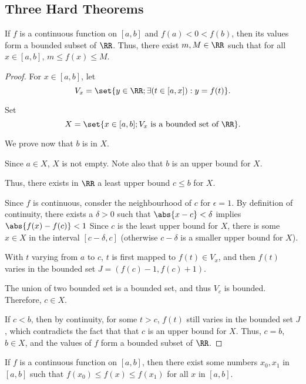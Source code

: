\documentclass[11pt]{scrartcl}
\begin{document}
\subsection{Three Hard Theorems}
\label{subsec:tht}
\begin{theorem}
  \label{thm:bounded}
  If \(f\) is a continuous function on \([a,b]\) and \(f(a)<0<f(b)\), then its
  values form a bounded subset of \(\RR\). Thus, there exist
  \(m,M\in\RR\) such that for all \(x\in[a,b]\), \(m\leq f(x)\leq M\).
\end{theorem}
\begin{proof}
  For \(x \in [a,b]\), let
  \[V_{x}=\set{y\in\RR ; \exists (t\in[a,x]):y = f(t)}.\]

  Set \[X=\set{x\in[a,b];V_{x}\text{\ is a bounded set of\ }\RR }.\]

  We prove now that \(b\) is in \(X\).\vv

  Since \(a\in X\), \(X\) is not empty. Note also that \(b\) is an
  upper bound for \(X\).

  Thus, there exists in \(\RR\) a least upper bound \(c \leq b\) for
  \(X\). \vv

  Since \(f\) is continuous, consder the neighbourhood of \(c\) for
  \(\epsilon = 1\). By definition of continuity, there exists a
  \(\delta > 0\) such that \(\abs{x-c}<\delta\) implies
  \(\abs{f(x) - f(c)}<1\) Since \(c\) is the least upper bound for
  \(X\), there is some \(x\in X\) in the interval \([c-\delta, c]\)
  (otherwise \(c-\delta\) is a smaller upper bound for \(X\)). \vv

  With \(t\) varying from \(a\) to \(c\), \(t\) is first mapped to
  \(f(t)\in V_{x}\), and then \(f(t)\) varies in the bounded set
  \(J = (f(c)-1, f(c)+1)\). \vv

  The union of two bounded set is a bounded set, and thus \(V_{c}\)
  is bounded. Therefore, \(c\in X\). \vv

  If \(c<b\), then by continuity, for some \(t>c\), \(f(t)\) still
  varies in the bounded set \(J\), which contradicts the fact that
  that \(c\) is an upper bound for \(X\). Thus, \(c=b\), \(b \in X\),
  and the values of \(f\) form a bounded subset of \(\RR\).
\end{proof}
\begin{theorem}
  If \(f\) is a continuous function on \([a,b]\), then there exist
  some numbers \(x_{0}, x_{1}\) in \([a,b]\) such that
  \(f(x_{0})\leq f(x)\leq f(x_{1})\) for all \(x\) in \([a,b]\).
\end{theorem}
\end{document}
